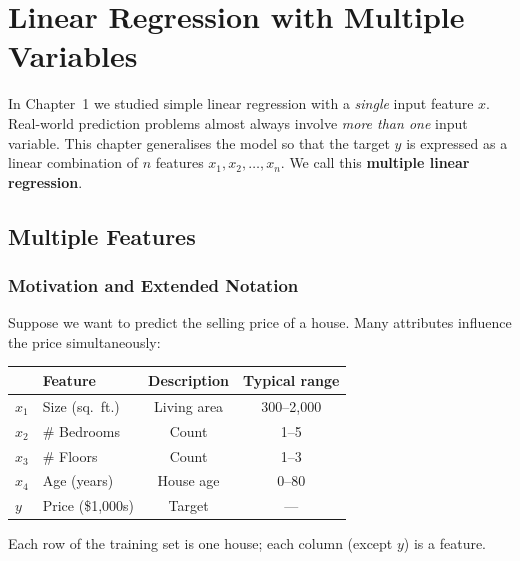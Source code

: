 \chapter{Linear Regression with Multiple Variables}

In Chapter~1 we studied simple linear regression with a \emph{single} input
feature $x$. Real-world prediction problems almost always involve
\emph{more than one} input variable. This chapter generalises the model so
that the target $y$ is expressed as a linear combination of $n$ features
$x_1, x_2, \ldots, x_n$. We call this \textbf{multiple linear regression}.

\section{Multiple Features}

\subsection{Motivation and Extended Notation}

\begin{example}
Suppose we want to predict the selling price of a house. Many attributes
influence the price simultaneously:

\begin{center}
\begin{tabular}{llcc}
\toprule
& \textbf{Feature} & \textbf{Description} & \textbf{Typical range}\\
\midrule
$x_1$ & Size (sq.\ ft.) & Living area & 300--2{,}000\\
$x_2$ & \# Bedrooms     & Count       & 1--5\\
$x_3$ & \# Floors       & Count       & 1--3\\
$x_4$ & Age (years)     & House age   & 0--80\\
\midrule
$y$   & Price (\$1{,}000s) & Target   & ---\\
\bottomrule
\end{tabular}
\end{center}
Each row of the training set is one house; each column (except $y$) is a
feature.
\end{example}

